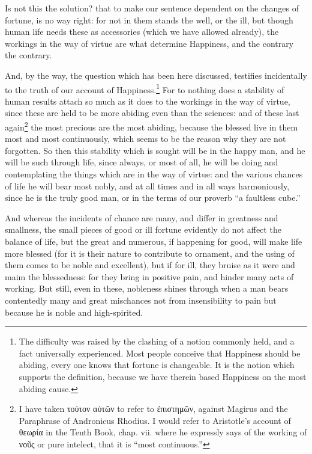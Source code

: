 Is not this the solution? that to make our sentence dependent on the changes of
fortune, is no way right: for not in them stands the well, or the ill, but
though human life needs these as accessories (which we have allowed already),
the workings in the way of virtue are what determine Happiness, and the
contrary the contrary.

And, by the way, the question which has been here discussed, testifies
incidentally to the truth of our account of Happiness.\footnote{The difficulty was raised by the clashing of a notion commonly held, and a fact
universally experienced. Most people conceive that Happiness should be abiding,
every one knows that fortune is changeable. It is the notion which supports the
definition, because we have therein based Happiness on the most abiding cause.}
For to nothing does a stability of human results attach so much as it does to
the workings in the way of virtue, since these are held to be more abiding even
than the sciences: and of these last again\footnote{I have taken τούτον
αὐτῶν to refer to
ἐπιστημῶν, against Magirus and
the Paraphrase of Andronicus Rhodius. I would refer to Aristotle’s
account of θεωρία in the Tenth Book, chap. vii.
where he expressly says of the working of νοῦς or pure
intelect, that it is “most continuous.”}
the most precious are the most abiding, because the blessed live in them most
and most continuously, which seems to be the reason why they are not forgotten.
So then this stability which is sought will be in the happy man, and he will be
such through life, since always, or most of all, he will be doing and
contemplating the things which are in the way of virtue: and the various
chances of life he will bear most nobly, and at all times and in all ways
harmoniously, since he is the truly good man, or in the terms of our proverb
“a faultless cube.”

And whereas the incidents of chance are many, and differ in greatness and
smallness, the small pieces of good or ill fortune evidently do not affect the
balance of life, but the great and numerous, if happening for good, will make
life more blessed (for it is their nature to contribute to ornament, and the
using of them comes to be noble and excellent), but if for ill, they bruise as
it were and maim the blessedness: for they bring in positive pain, and hinder
many acts of working. But still, even in these, nobleness shines through when a
man bears contentedly many and great mischances not from insensibility to pain
but because he is noble and high-spirited.

